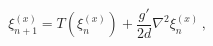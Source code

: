 \begin{equation}
\xi^{(x)}_{n+1} = T\left(\xi^{(x)}_n\right) + \frac{g'}{2d}
                  \nabla^2 \xi^{(x)}_n \, ,
\label{eq23}
\end{equation}

